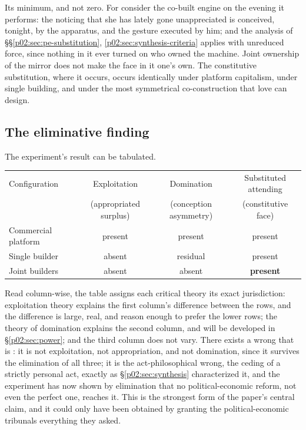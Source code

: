 Its minimum, and not zero. For consider the co-built engine on the evening it performs: the noticing that she has lately gone unappreciated is conceived, tonight, by the apparatus, and the gesture executed by him; and the analysis of \S\S\ref{p02:sec:pe-substitution}, \ref{p02:sec:synthesis-criteria} applies with unreduced force, since nothing in it ever turned on who owned the machine. Joint ownership of the mirror does not make the face in it one's own. The constitutive substitution, where it occurs, occurs identically under platform capitalism, under single building, and under the most symmetrical co-construction that love can design.

\subsection{The eliminative finding}
\label{p02:sec:ex-finding}

The experiment's result can be tabulated.

\begin{center}
\small
\begin{tabular}{lccc}
\hline
Configuration & Exploitation & Domination & Substituted attending \\
 & (appropriated surplus) & (conception asymmetry) & (constitutive face) \\
\hline
Commercial platform & present & present & present \\
Single builder & absent & residual & present \\
Joint builders & absent & absent & \textbf{present} \\
\hline
\end{tabular}
\end{center}

\vspace{0.3em}
\noindent Read column-wise, the table assigns each critical theory its exact jurisdiction: exploitation theory explains the first column's difference between the rows, and the difference is large, real, and reason enough to prefer the lower rows; the theory of domination explains the second column, and will be developed in \S\ref{p02:sec:power}; and the third column does not vary. There exists a wrong that is : it is not exploitation, not appropriation, and not domination, since it survives the elimination of all three; it is the act-philosophical wrong, the ceding of a strictly personal act, exactly as \S\ref{p02:sec:synthesis} characterized it, and the experiment has now shown by elimination that no political-economic reform, not even the perfect one, reaches it. This is the strongest form of the paper's central claim, and it could only have been obtained by granting the political-economic tribunals everything they asked.


